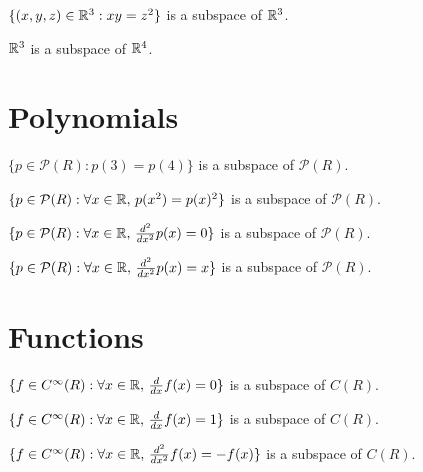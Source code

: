 \documentclass{homework}
\begin{document}
\begin{truefalse}
  $\{ (x,y,z) \in \mathbb{R}^3 : xy = z^2 \}$ is a subspace of $\mathbb{R}^3$.
\end{truefalse}

\begin{truefalse}
  $\mathbb{R}^3$ is a subspace of $\mathbb{R}^4$.
\end{truefalse}

\section{Polynomials}

\begin{truefalse}
  $\{ p \in \mathcal{P}(R) : p(3) = p(4) \}$ is a subspace of $\mathcal{P}(R)$.
\end{truefalse}

\begin{truefalse}
  $\{ p \in \mathcal{P}(R) : \forall x \in \mathbb{R},\, p(x^2) = p(x)^2 \}$ is a subspace of $\mathcal{P}(R)$.
\end{truefalse}

\begin{truefalse}
  $\{ p \in \mathcal{P}(R) : \forall x \in \mathbb{R},\, \frac{d^2}{dx^2} p(x) = 0 \}$ is a subspace of $\mathcal{P}(R)$.
\end{truefalse}

\begin{truefalse}
  $\{ p \in \mathcal{P}(R) : \forall x \in \mathbb{R},\, \frac{d^2}{dx^2} p(x) = x \}$ is a subspace of $\mathcal{P}(R)$.
\end{truefalse}

\section{Functions}

\begin{truefalse}
  $\{ f \in C^\infty(R) : \forall x \in \mathbb{R},\, \frac{d}{dx} f(x) = 0 \}$ is a subspace of $C(R)$.
\end{truefalse}

\begin{truefalse}
  $\{ f \in C^\infty(R) : \forall x \in \mathbb{R},\, \frac{d}{dx} f(x) = 1 \}$ is a subspace of $C(R)$.
\end{truefalse}

\begin{truefalse}
  $\{ f \in C^\infty(R) : \forall x \in \mathbb{R},\, \frac{d^2}{dx^2} f(x) = -f(x) \}$ is a subspace of $C(R)$.
\end{truefalse}
\end{document}
